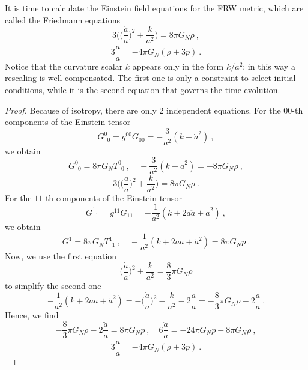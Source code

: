     It is time to calculate the Einstein field equations for the FRW metric, which are called the Friedmann equations
    \begin{equation*}
        3 \Big ( \Big ( \frac{\dot a}{a} \Big)^2 + \frac{k}{a^2} \Big ) = 8 \pi G_N \rho ~, 
    \end{equation*}
    \begin{equation*}
        3 \frac{\ddot a}{a} = - 4 \pi G_N (\rho + 3 p) ~.
    \end{equation*}
    Notice that the curvature scalar $k$ appears only in the form $k / a^2$; in this way a rescaling is well-compensated. The first one is only a constraint to select initial conditions, while it is the second equation that governs the time evolution.
    \begin{proof}
        Because of isotropy, there are only $2$ independent equations. For the $00$-th components of the Einstein tensor
        \begin{equation*}
            G^0_{\phantom 0 0} = g^{00} G_{00} = - \frac{3}{a^2} (k + \dot a^2) ~,
        \end{equation*}
        we obtain 
        \begin{equation*}
            G^0_{\phantom 00} = 8 \pi G_N T^{0}_{\phantom 00} ~, \quad - \frac{3}{a^2} (k + \dot a^2) = - 8 \pi G_N \rho ~, 
        \end{equation*}
        \begin{equation*}
            3 \Big ( \Big ( \frac{\dot a}{a} \Big)^2 + \frac{k}{a^2} \Big ) = 8 \pi G_N \rho ~.
        \end{equation*}
        For the $11$-th components of the Einstein tensor
        \begin{equation*}
            G^1_{\phantom 11} = g^{11} G_{11} = - \frac{1}{a^2} (k + 2 a \ddot a + \dot a^2) ~,
        \end{equation*}
        we obtain 
        \begin{equation*}
            G^1_{\phantom 1} = 8 \pi G_N T^{1}_{\phantom 11} ~, \quad - \frac{1}{a^2} (k + 2 a \ddot a + \dot a^2) = 8 \pi G_N p ~.
        \end{equation*}
        Now, we use the first equation 
        \begin{equation*}
            \Big ( \frac{\dot a}{a} \Big)^2 + \frac{k}{a^2} = \frac{8}{3} \pi G_N \rho
        \end{equation*}
        to simplify the second one 
        \begin{equation*}
            - \frac{1}{a^2} (k + 2 a \ddot a + \dot a^2) = - \Big ( \frac{\dot a}{a} \Big)^2 - \frac{k}{a^2} - 2 \frac{\ddot a}{a} = - \frac{8}{3} \pi G_N \rho - 2 \frac{\ddot a}{a} ~.
        \end{equation*}
        Hence, we find
        \begin{equation*}
            - \frac{8}{3} \pi G_N \rho - 2 \frac{\ddot a}{a} = 8 \pi G_N p ~, \quad 6 \frac{\ddot a}{a} = - 24 \pi G_N p - 8 \pi G_N \rho ~,
        \end{equation*}
        \begin{equation*}
            3 \frac{\ddot a}{a} = - 4 \pi G_N (\rho + 3 p) ~.
        \end{equation*}
    \end{proof}
